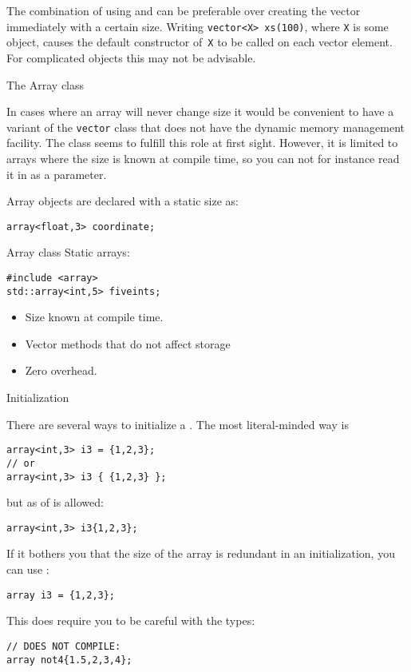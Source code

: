 The combination of using  and 
can be preferable over creating the vector immediately with a certain size.
Writing \lstinline+vector<X> xs(100)+, where \lstinline{X} is some object,
causes the default constructor of~\lstinline{X} to be called on each vector element.
For complicated objects this may not be advisable.

 {The Array class}
\label{sec:cpp-array}
\label{sec:stdarray}

In cases where an array will never change size it would be convenient
to have a variant of the \lstinline{vector} class that does not have
the dynamic memory management facility.
The  class seems to fulfill this role at first sight.
However, it
is limited to arrays where the size is known at compile time,
so you can not for instance read it in as a parameter.


Array objects are declared with a static size as:
\begin{lstlisting}
array<float,3> coordinate;
\end{lstlisting}


\begin{slide}{Array class}
\label{sl:array-class}
Static arrays:
\begin{lstlisting}
#include <array>
std::array<int,5> fiveints;
\end{lstlisting}
\begin{itemize}
\item Size known at compile time.
\item Vector methods that do not affect storage
\item Zero overhead.
\end{itemize}
\end{slide}

 {Initialization}

There are several ways to initialize a .
The most literal-minded way is
\begin{lstlisting}
array<int,3> i3 = {1,2,3};
// or
array<int,3> i3 { {1,2,3} };
\end{lstlisting}
but as of   is allowed:
\begin{lstlisting}
array<int,3> i3{1,2,3};  
\end{lstlisting}
If it bothers you that the size of the array is redundant in an initialization,
you can use  :
\begin{lstlisting}
array i3 = {1,2,3};  
\end{lstlisting}
This does require you to be careful with the types:
\begin{lstlisting}
// DOES NOT COMPILE:
array not4{1.5,2,3,4};
\end{lstlisting}

